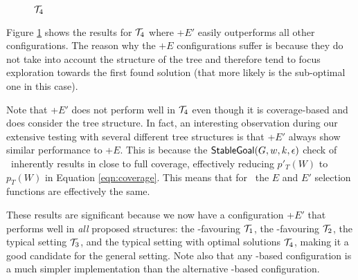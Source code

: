 \begin{figure}[ht]
\centering
{}
\caption{${\mathcal{T}}_4$}
\label{fig:T4_result}
\end{figure}

Figure \ref{fig:T4_result} shows the results for ${\mathcal{T}}_4$ where \CL+$E'$ easily outperforms all other configurations. The reason why the $+E$ configurations suffer is because they do not take into account the structure of the tree and therefore tend to focus exploration towards the first found solution (that more likely is the sub-optimal one in this case). 

Note that \BUL+$E'$ does not perform well in ${\mathcal{T}}_4$ even though it is coverage-based and does consider the tree structure. In fact, an interesting observation during our extensive testing with several different tree structures is that \BUL+$E'$ always show similar performance to \BUL+$E$. This is because the $\mathsf{StableGoal}(G,w,k,\epsilon)$ check of \BUL\ inherently results in close to full coverage, effectively reducing $p'_T(W)$ to $p_T(W)$ in Equation \ref{eqn:coverage}. This means that for \BUL\, the $E$ and $E'$ selection functions are effectively the same.

These results are significant because we now have a configuration \CL+$E'$ that performs well in \textit{all} proposed structures: the \CL-favouring ${\mathcal{T}}_1$, the \BUL-favouring ${\mathcal{T}}_2$, the typical setting ${\mathcal{T}}_3$, and the typical setting with optimal solutions ${\mathcal{T}}_4$, making it a good candidate for the general setting. Note also that any \CL-based configuration is a much simpler implementation than the alternative \BUL-based configuration.






